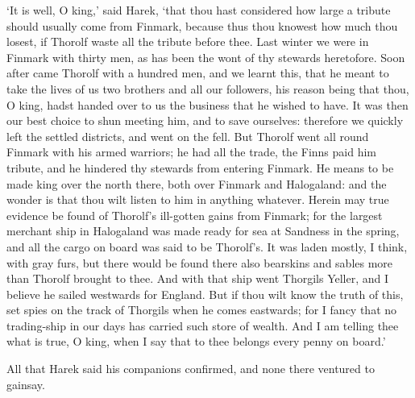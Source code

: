`It is well, O king,' said Harek, `that thou hast considered how large a tribute should usually come from Finmark, because thus thou knowest how much thou losest, if Thorolf waste all the tribute before thee. Last winter we were in Finmark with thirty men, as has been the wont of thy stewards heretofore. Soon after came Thorolf with a hundred men, and we learnt this, that he meant to take the lives of us two brothers and all our followers, his reason being that thou, O king, hadst handed over to us the business that he wished to have. It was then our best choice to shun meeting him, and to save ourselves: therefore we quickly left the settled districts, and went on the fell. But Thorolf went all round Finmark with his armed warriors; he had all the trade, the Finns paid him tribute, and he hindered thy stewards from entering Finmark. He means to be made king over the north there, both over Finmark and Halogaland: and the wonder is that thou wilt listen to him in anything whatever. Herein may true evidence be found of Thorolf's ill-gotten gains from Finmark; for the largest merchant ship in Halogaland was made ready for sea at Sandness in the spring, and all the cargo on board was said to be Thorolf's. It was laden mostly, I think, with gray furs, but there would be found there also bearskins and sables more than Thorolf brought to thee. And with that ship went Thorgils Yeller, and I believe he sailed westwards for England. But if thou wilt know the truth of this, set spies on the track of Thorgils when he comes eastwards; for I fancy that no trading-ship in our days has carried such store of wealth. And I am telling thee what is true, O king, when I say that to thee belongs every penny on board.'

All that Harek said his companions confirmed, and none there ventured to gainsay.
